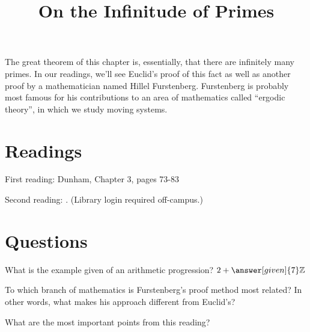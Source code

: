 \documentclass[nooutcomes]{ximera}
\title{On the Infinitude of Primes}
\begin{document}
\begin{abstract}
    
\end{abstract}
\maketitle



The great theorem of this chapter is, essentially, that there are infinitely many primes.  In our readings, we'll see Euclid's proof of this fact as well as another proof by a mathematician named Hillel Furstenberg. Furstenberg is probably most famous for his contributions to an area of mathematics called ``ergodic theory'', in which we study moving systems.


\section{Readings}
First reading: Dunham, Chapter 3, pages 73-83

Second reading: . (Library login required off-campus.)



\section{Questions}

\begin{question}
What is the example given of an arithmetic progression? $2 + \answer[given]{7} \mathbb{Z}$
\end{question}

\begin{question}
To which branch of mathematics is Furstenberg's proof method most related?  In other words, what makes his approach different from Euclid's?
\begin{multipleChoice}
\end{multipleChoice}
\end{question}


\begin{question}
What are the most important points from this reading?
\begin{freeResponse}
\end{freeResponse}

\end{question}
\end{document}
